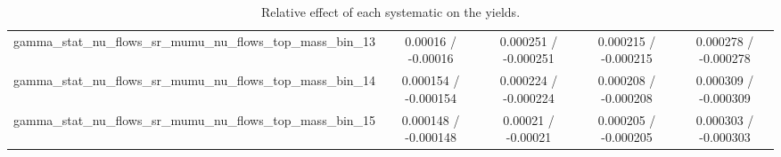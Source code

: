 \documentclass[10pt]{article}
\begin{document}
\begin{table}[htbp]
\begin{center}
\begin{tabular}{|c|c|c|c|c|}
  gamma_stat_nu_flows_sr_mumu_nu_flows_top_mass_bin_13 & 0.00016 / -0.00016 & 0.000251 / -0.000251 & 0.000215 / -0.000215 & 0.000278 / -0.000278 \\ 
  gamma_stat_nu_flows_sr_mumu_nu_flows_top_mass_bin_14 & 0.000154 / -0.000154 & 0.000224 / -0.000224 & 0.000208 / -0.000208 & 0.000309 / -0.000309 \\ 
  gamma_stat_nu_flows_sr_mumu_nu_flows_top_mass_bin_15 & 0.000148 / -0.000148 & 0.00021 / -0.00021 & 0.000205 / -0.000205 & 0.000303 / -0.000303 \\ 
\hline 
\end{tabular} 
\caption{Relative effect of each systematic on the yields.} 
\end{center} 
\end{table} 
\end{document}
